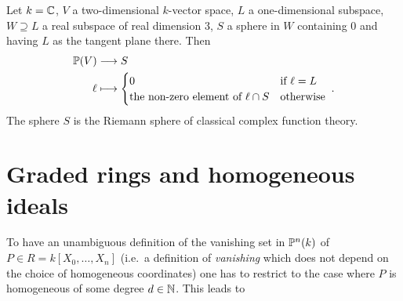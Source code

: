 \documentclass[a4paper,parskip=half,numbers=enddot, DIV=12, headheight=30pt]{scrreprt}
\begin{document}
\begin{example}
    Let $k=\mathbb{C}$, $V$ a two-dimensional $k$-vector space, $L$ a one-dimensional subspace, $W\supseteq L$ a real subspace of real dimension 3, $S$ a sphere in $W$ containing $0$ and having $L$ as the tangent plane there. Then 
    \begin{align*}
        \IP(V) &\morphism S\\
        \ell &\longmapsto \begin{cases} 0 &\text{if } \ell= L\\
        \text{the non-zero element of }\ell\cap S &\text{otherwise}\end{cases}\;.
    \end{align*}    
    The sphere $S$ is the Riemann sphere of classical complex function theory.
\end{example}


\section{Graded rings and homogeneous ideals}

To have an unambiguous definition of the vanishing set in $\mathbb{P}^n(k)$ of $P\in R=k[X_0,\ldots,X_n]$ (i.e.\ a definition of \emph{vanishing} which does not depend on the choice of homogeneous coordinates) one has to restrict to the case where $P$ is homogeneous of some degree $d\in\mathbb{N}$. This leads to
\end{document}
